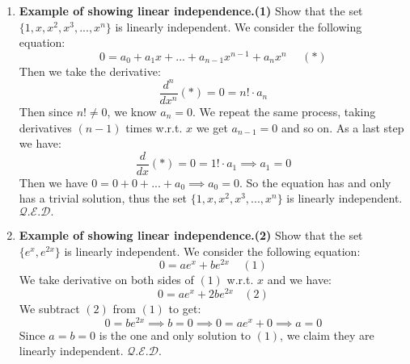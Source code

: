 \documentclass[oneside, 12pt]{book}
\newcommand{\settag}[1]{\renewcommand{\theenumi}{#1}}
\newcommand{\qed}{\hfill $\mathcal{Q}.\mathcal{E}.\mathcal{D}.$}
\newcommand{\tbf}[1]{\textbf{#1}}
\begin{document}
\begin{enumerate}
        \settag{1.4.*}
        \item \tbf{Example of showing linear independence.(1)} Show that the set $\{1,x,x^2,x^3,...,x^n\}$ is linearly independent. We consider the following equation:
        \begin{equation*}
            0 = a_0 + a_1x + ... + a_{n-1}x^{n-1}+a_n x^n~~~~~~(*)
        \end{equation*}
        Then we take the derivative:
        \begin{equation*}
            \frac{d^n}{dx^n}(*)= 0 = n!\cdot a_n
        \end{equation*}
        Then since $n! \neq 0$, we know $a_n=0$. We repeat the same process, taking derivatives $(n-1)$ times w.r.t. $x$ we get $a_{n-1}=0$ and so on. As a last step we have:
        \begin{equation*}
            \frac{d}{dx}(*) = 0 = 1!\cdot a_1 \implies a_1 = 0
        \end{equation*}
        Then we have $0 = 0 + 0 +... + a_0 \implies a_0 = 0$. So the equation has and only has a trivial solution, thus the set $\{1,x,x^2,x^3,...,x^n\}$ is linearly independent. \qed
        
        \settag{1.4.*}
        \item \tbf{Example of showing linear independence.(2)} Show that the set $\{e^x, e^{2x}\}$ is linearly independent. We consider the following equation:
        \begin{equation*}
            0 = ae^x + be^{2x}~~~~~(1)
        \end{equation*}
        We take derivative on both sides of $(1)$ w.r.t. $x$ and we have:
        \begin{equation*}
            0 = ae^x + 2be^{2x}~~~~(2)
        \end{equation*}
        We subtract $(2)$ from $(1)$ to get:
        \begin{equation*}
            0 = be^{2x} \implies b = 0 \implies 0 = ae^x + 0 \implies a = 0
        \end{equation*}
        Since $a=b=0$ is the one and only solution to $(1)$, we claim they are linearly independent. \qed
    \end{enumerate}
    
\end{document}
